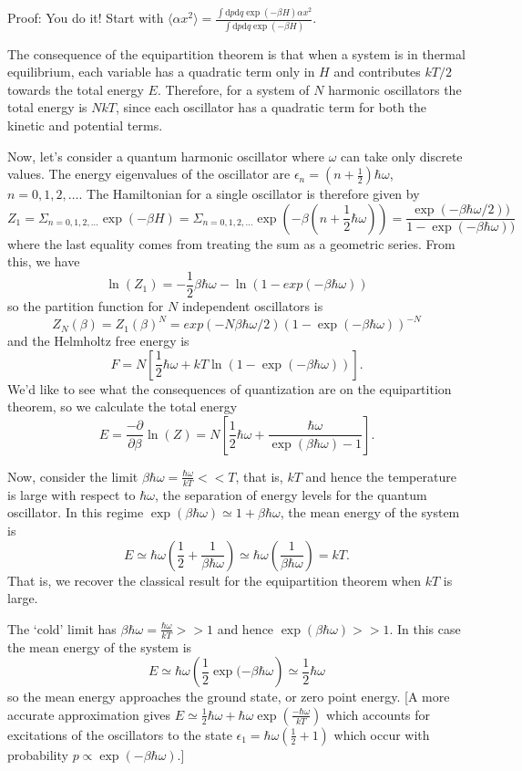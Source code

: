 Proof: You do it! Start with $\langle\alpha x^2\rangle = \frac{\int \mathrm{d}p\mathrm{d}q \exp(-\beta H)\alpha x^2}{\int \mathrm{d}p\mathrm{d}q \exp(-\beta H)}$.

The consequence of the equipartition theorem is that when a system is in thermal equilibrium, each variable has a quadratic term only in $H$ and contributes $kT/2$ towards the total energy $E$. Therefore, for a system of $N$ harmonic oscillators the total energy is $NkT$, since each oscillator has a quadratic term for both the kinetic and potential terms.

Now, let's consider a quantum harmonic oscillator where $\omega$ can take only discrete values. The energy eigenvalues of the oscillator are $\epsilon_n = (n+\frac12)\hbar\omega$, $n=0,1,2,\ldots$. The Hamiltonian for a single oscillator is therefore given by
\[
	Z_1 = \Sigma_{n=0,1,2,\ldots}\exp(-\beta H) =  \Sigma_{n=0,1,2,\ldots}\exp(-\beta(n+\frac12\hbar\omega)) = \frac{\exp(-\beta\hbar\omega/2))}{1-\exp(-\beta\hbar\omega))}
\] 
where the last equality comes from treating the sum as a geometric series.
From this, we have
\[
	\ln(Z_1) = -\frac12\beta\hbar\omega -\ln(1-exp(-\beta\hbar\omega))
\]
so the partition function for $N$ independent oscillators is
\[
	Z_N(\beta) = Z_1(\beta)^N = exp(-N\beta\hbar\omega/2)\left(1-\exp(-\beta\hbar\omega)\right)^{-N} 
\]
and the Helmholtz free energy is
\[
	F = N\left[\frac12\hbar\omega + kT\ln(1-\exp(-\beta\hbar\omega))\right].
\]
We'd like to see what the consequences of quantization are on the equipartition theorem, so we calculate the total energy
\[
	E = \frac{-\partial}{\partial \beta}\ln(Z) = N\left[\frac12 \hbar\omega + \frac{\hbar\omega}{\exp(\beta\hbar\omega) - 1}\right].
\]

Now, consider the limit $\beta\hbar\omega = \frac{\hbar\omega}{kT} << T$, that is, $kT$ and hence the temperature is large with respect to $\hbar\omega$, the separation of energy levels for the quantum oscillator. In this regime $\exp(\beta\hbar\omega)\simeq 1+\beta\hbar\omega$, the mean energy of the system is
\[
	E \simeq \hbar\omega\left(\frac12 + \frac{1}{\beta\hbar\omega}\right) \simeq \hbar\omega\left(\frac{1}{\beta\hbar\omega}\right) = kT.
\]
That is, we recover the classical result for the equipartition theorem when $kT$ is large.

The `cold' limit has $\beta\hbar\omega = \frac{\hbar\omega}{kT}>>1$ and hence $\exp(\beta\hbar\omega)>>1$. In this case the mean energy of the system is
\[
	E\simeq \hbar\omega\left(\frac12\exp(-\beta\hbar\omega\right) \simeq\frac12\hbar\omega
\]
so the mean energy approaches the ground state, or zero point energy. [A more accurate approximation gives $E\simeq \frac12\hbar\omega+\hbar\omega\exp\left(\frac{-\hbar\omega}{kT}\right)$ which accounts for excitations of the oscillators to the state $\epsilon_1 = \hbar\omega(\frac12+1)$ which occur with probability $p\propto\exp(-\beta\hbar\omega)$.]


